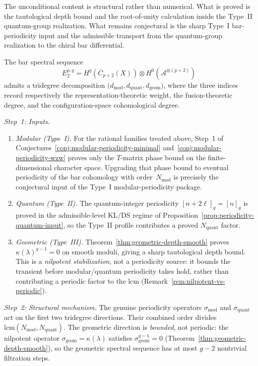 \begin{evidence}
The unconditional content is structural rather than numerical.
What is proved is the tautological depth bound and the root-of-unity
calculation inside the Type~II quantum-group realization. What remains
conjectural is the sharp Type~I bar-periodicity input and the
admissible transport from the quantum-group realization to the chiral
bar differential.

The bar spectral sequence
\[
E_2^{p,q} = H^q(\overline{C}_{p+2}(X))
 \otimes H^0(\mathcal{A}^{\otimes(p+2)})
\]
admits a tridegree decomposition
$\bigl(d_{\mathrm{mod}}, d_{\mathrm{quant}}, d_{\mathrm{geom}}\bigr)$,
where the three indices record respectively the representation-theoretic
weight, the fusion-theoretic degree, and the configuration-space
cohomological degree.

\emph{Step~1: Inputs.}
\begin{enumerate}
\item \emph{Modular (Type~I).} For the rational families treated
 above, Step~1 of
 Conjectures~\ref{conj:modular-periodicity-minimal}
 and~\ref{conj:modular-periodicity-wzw} proves only the
 $T$-matrix phase bound on the finite-dimensional character space.
 Upgrading that phase bound to eventual periodicity of the bar
 cohomology with order~$N_{\mathrm{mod}}$ is precisely the
 conjectural input of the Type~I modular-periodicity package.
\item \emph{Quantum (Type~II).} The quantum-integer periodicity
 $[n + 2\ell]_q = [n]_q$ is proved in the admissible-level
 KL/DS regime of Proposition~\ref{prop:periodicity-quantum-input}, so
 the Type~II profile contributes a proved
 $N_{\mathrm{quant}}$ factor.
\item \emph{Geometric (Type~III).}
 Theorem~\ref{thm:geometric-depth-smooth} proves
 $\kappa(\lambda)^{g-1} = 0$ on smooth moduli, giving a
 sharp tautological depth bound. This is a \emph{nilpotent
 stabilization}, not a periodicity source: it bounds the
 transient before modular/quantum periodicity takes hold,
 rather than contributing a periodic factor to the lcm
 (Remark~\ref{rem:nilpotent-vs-periodic}).
\end{enumerate}

\emph{Step~2: Structural mechanism.}
The genuine periodicity operators
$\sigma_{\mathrm{mod}}$ and $\sigma_{\mathrm{quant}}$
act on the first two tridegree directions. Their combined order
divides
$\mathrm{lcm}(N_{\mathrm{mod}}, N_{\mathrm{quant}})$.
The geometric direction is \emph{bounded}, not periodic: the
nilpotent operator $\sigma_{\mathrm{geom}} = \kappa(\lambda)$
satisfies $\sigma_{\mathrm{geom}}^{g-1} = 0$
(Theorem~\ref{thm:geometric-depth-smooth}), so the
geometric spectral sequence has at most $g - 2$ nontrivial
filtration steps.


\end{evidence}

